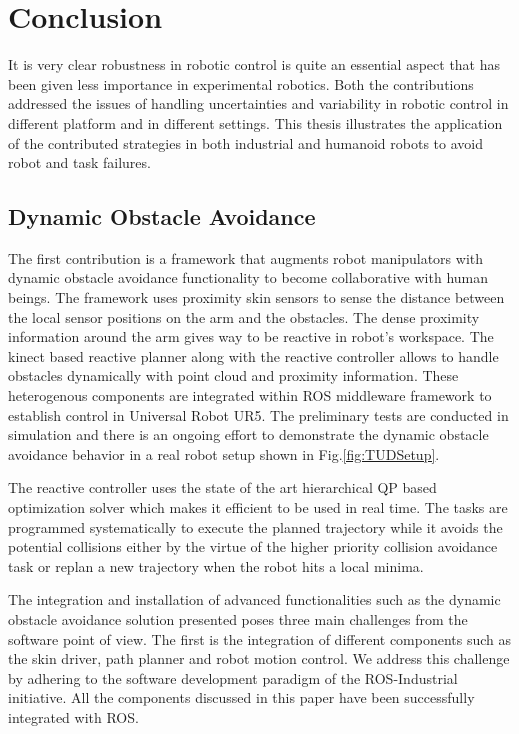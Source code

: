 \documentclass[a4paper,11pt,twoside]{StyleThese}
\begin{document}
\setcounter{chapter}{2}
\fi

\chapter*{Conclusion}
It is very clear robustness in robotic control is quite an essential aspect that has been given less importance in experimental robotics. Both the contributions addressed the issues of handling uncertainties and variability in robotic control in different platform and in different settings. This thesis illustrates the application of the contributed strategies in both industrial and humanoid robots to avoid robot and task failures. 
\section{Dynamic Obstacle Avoidance}
The first contribution is a framework that augments robot manipulators with dynamic obstacle avoidance functionality to become collaborative with human beings. The framework uses proximity skin sensors to sense the distance between the local sensor positions on the arm and the obstacles. The dense proximity information around the arm gives way to be reactive in robot's workspace. The kinect based reactive planner along with the reactive controller allows to handle obstacles dynamically with  point cloud and proximity information. These heterogenous components are integrated within ROS middleware framework to establish control in Universal Robot UR5. The preliminary tests are conducted in simulation and there is an ongoing effort to demonstrate the dynamic obstacle avoidance behavior in a real robot setup shown in Fig.\ref{fig:TUDSetup}. 


The reactive controller uses the state of the art hierarchical QP based optimization solver which makes it efficient to be used in real time. The tasks are programmed systematically to execute the planned trajectory while it avoids the potential collisions either by the virtue of the higher priority collision avoidance task or replan a new trajectory when the robot hits a local minima. 


The integration and installation of advanced functionalities such as the dynamic
obstacle avoidance solution presented poses three main challenges from the
software point of view. The first is the integration of different components such as the skin driver, path planner and robot motion control. We address this challenge by adhering to the software development paradigm of the ROS-Industrial initiative. All the components discussed in this paper have been successfully integrated with ROS.
\end{document}
